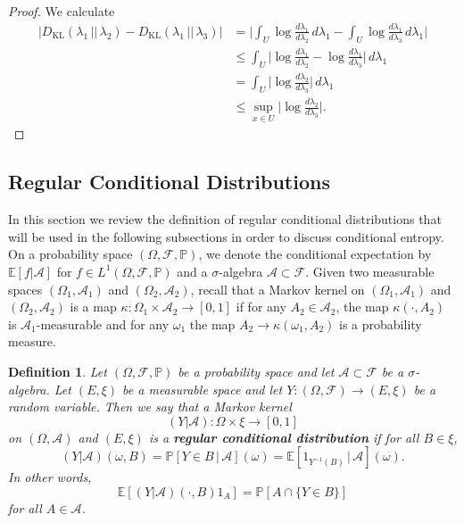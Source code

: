 \documentclass[10pt, english,oneside,reqno]{amsart}
\theoremstyle{plain}
\newtheorem{definition}[theorem]{Definition}
\theoremstyle{remark}
\numberwithin{equation}{section}
\numberwithin{figure}{section}
\newcommand{\E}{\mathbb{E}}
\begin{document}
\begin{proof}
    We calculate 
    \begin{align*}
        |D_{\mathrm{KL}}(\lambda_1 \,||\, \lambda_2) - D_{\mathrm{KL}}(\lambda_1 \,||\, \lambda_3)| &= \bigg|  \int_U \log \frac{d\lambda_1}{d\lambda_2} \, d\lambda_1 - \int_U \log \frac{d\lambda_1}{d\lambda_3} \, d\lambda_1  \bigg|  \\
        &\leq \int_U \bigg| \log \frac{d\lambda_1}{d\lambda_2} - \log \frac{d\lambda_1}{d\lambda_3} \bigg| \, d\lambda_1 \\
        &= \int_U \bigg|  \log \frac{d\lambda_2}{d\lambda_3} \bigg| \, d\lambda_1 \\
        &\leq \sup_{x \in U} \bigg| \log \frac{d\lambda_2}{d\lambda_3}  \bigg|.
    \end{align*}
\end{proof}

\subsection{Regular Conditional Distributions} \label{RegConSection}

In this section we review the definition of regular conditional distributions that will be used in the following subsections in order to discuss conditional entropy. On a probability space $(\Omega, \mathscr{F}, \mathbb{P})$, we denote the conditional expectation by $\E[f|\mathscr{A}]$ for $f \in L^1(\Omega, \mathscr{F}, \mathbb{P})$ and a $\sigma$-algebra $\mathscr{A} \subset \mathscr{F}$. Given two measurable spaces $(\Omega_1, \mathscr{A}_1)$ and $(\Omega_2, \mathscr{A}_2)$, recall that a Markov kernel on $(\Omega_1, \mathscr{A}_1)$ and $(\Omega_2, \mathscr{A}_2)$ is a map $\kappa : \Omega_1 \times \mathscr{A}_2 \to [0,1]$ if for any $A_2 \in \mathscr{A}_2$, the map $\kappa(\cdot, A_2)$ is $\mathscr{A}_1$-measurable and for any $\omega_1$ the map $A_2 \to \kappa(\omega_1, A_2)$ is a probability measure. 

\begin{definition}
    Let $(\Omega, \mathscr{F}, \mathbb{P})$ be a probability space and let $\mathscr{A} \subset \mathscr{F}$ be a $\sigma$-algebra. Let $(E, \xi)$ be a measurable space and let $Y : (\Omega, \mathscr{F}) \to (E, \xi)$ be a random variable. Then we say that a Markov kernel $$(Y|\mathscr{A}) : \Omega \times \xi \to [0,1]$$ on $(\Omega, \mathscr{A})$ and $(E, \xi)$ is a \textbf{regular conditional distribution} if for all $B \in \xi$, $$(Y|\mathscr{A})(\omega, B) = \mathbb{P}[Y \in B \,|\, \mathscr{A}](\omega) = \mathbb{E}[1_{Y^{-1}(B)}\,|\, \mathscr{A}](\omega).$$ In other words, $$\mathbb{E}[(Y|\mathscr{A})(\cdot, B)1_A] = \mathbb{P}[A \cap \{ Y \in B \}]$$ for all $A \in \mathscr{A}$. 
\end{definition}
\end{document}
